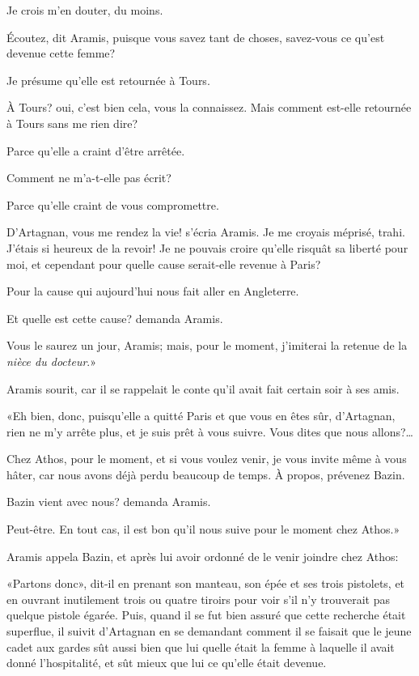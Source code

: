 \speak  Je crois m'en douter, du moins. 

\speak  Écoutez, dit Aramis, puisque vous savez tant de choses, savez-vous ce qu'est devenue cette femme? 

\speak  Je présume qu'elle est retournée à Tours. 

\speak  À Tours? oui, c'est bien cela, vous la connaissez. Mais comment est-elle retournée à Tours sans me rien dire? 

\speak  Parce qu'elle a craint d'être arrêtée. 

\speak  Comment ne m'a-t-elle pas écrit? 

\speak  Parce qu'elle craint de vous compromettre. 

\speak  D'Artagnan, vous me rendez la vie! s'écria Aramis. Je me croyais méprisé, trahi. J'étais si heureux de la revoir! Je ne pouvais croire qu'elle risquât sa liberté pour moi, et cependant pour quelle cause serait-elle revenue à Paris? 

\speak  Pour la cause qui aujourd'hui nous fait aller en Angleterre. 

\speak  Et quelle est cette cause? demanda Aramis. 

\speak  Vous le saurez un jour, Aramis; mais, pour le moment, j'imiterai la retenue de la \textit{nièce du docteur}.» 

Aramis sourit, car il se rappelait le conte qu'il avait fait certain soir à ses amis. 

«Eh bien, donc, puisqu'elle a quitté Paris et que vous en êtes sûr, d'Artagnan, rien ne m'y arrête plus, et je suis prêt à vous suivre. Vous dites que nous allons?\dots 

\speak  Chez Athos, pour le moment, et si vous voulez venir, je vous invite même à vous hâter, car nous avons déjà perdu beaucoup de temps. À propos, prévenez Bazin. 

\speak  Bazin vient avec nous? demanda Aramis. 

\speak  Peut-être. En tout cas, il est bon qu'il nous suive pour le moment chez Athos.» 

Aramis appela Bazin, et après lui avoir ordonné de le venir joindre chez Athos: 

«Partons donc», dit-il en prenant son manteau, son épée et ses trois pistolets, et en ouvrant inutilement trois ou quatre tiroirs pour voir s'il n'y trouverait pas quelque pistole égarée. Puis, quand il se fut bien assuré que cette recherche était superflue, il suivit d'Artagnan en se demandant comment il se faisait que le jeune cadet aux gardes sût aussi bien que lui quelle était la femme à laquelle il avait donné l'hospitalité, et sût mieux que lui ce qu'elle était devenue. 

